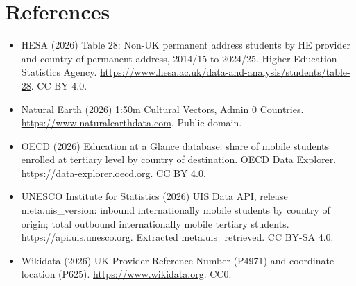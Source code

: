 \documentclass[11pt,a4paper]{article}
\begin{document}
\section*{References}
\small
\begin{itemize}\setlength{\itemsep}{2pt}
\item HESA (2026) Table 28: Non-UK permanent address students by HE provider and country of permanent address, 2014/15 to 2024/25. Higher Education Statistics Agency. \url{https://www.hesa.ac.uk/data-and-analysis/students/table-28}. CC BY 4.0.
\item Natural Earth (2026) 1:50m Cultural Vectors, Admin 0 Countries. \url{https://www.naturalearthdata.com}. Public domain.
\item OECD (2026) Education at a Glance database: share of mobile students enrolled at tertiary level by country of destination. OECD Data Explorer. \url{https://data-explorer.oecd.org}. CC BY 4.0.
\item UNESCO Institute for Statistics (2026) UIS Data API, release {{meta.uis_version}}: inbound internationally mobile students by country of origin; total outbound internationally mobile tertiary students. \url{https://api.uis.unesco.org}. Extracted {{meta.uis_retrieved}}. CC BY-SA 4.0.
\item Wikidata (2026) UK Provider Reference Number (P4971) and coordinate location (P625). \url{https://www.wikidata.org}. CC0.
\end{itemize}
\end{document}
